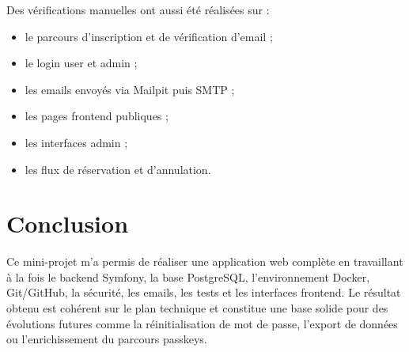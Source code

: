 \documentclass[12pt,a4paper]{report}
\begin{document}
Des vérifications manuelles ont aussi été réalisées sur :
\begin{itemize}[leftmargin=1.2cm]
    \item le parcours d'inscription et de vérification d'email ;
    \item le login user et admin ;
    \item les emails envoyés via Mailpit puis SMTP ;
    \item les pages frontend publiques ;
    \item les interfaces admin ;
    \item les flux de réservation et d'annulation.
\end{itemize}

\chapter*{Conclusion}

Ce mini-projet m'a permis de réaliser une application web complète en travaillant à la fois le backend Symfony, la base PostgreSQL, l'environnement Docker, Git/GitHub, la sécurité, les emails, les tests et les interfaces frontend. Le résultat obtenu est cohérent sur le plan technique et constitue une base solide pour des évolutions futures comme la réinitialisation de mot de passe, l'export de données ou l'enrichissement du parcours passkeys.
\end{document}
